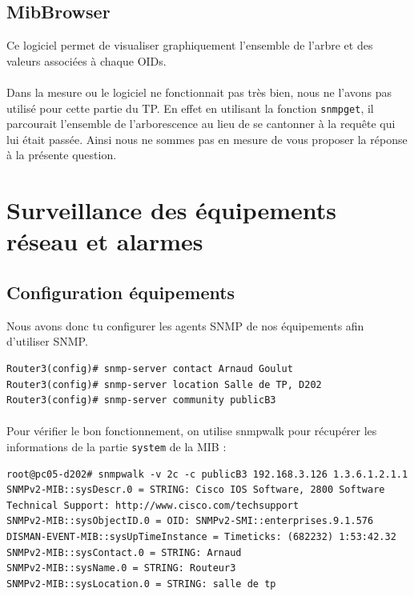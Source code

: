 \documentclass[12pt,a4paper,notitlepage]{article}
\begin{document}
\subsection{MibBrowser}
Ce logiciel permet de visualiser graphiquement l'ensemble de l'arbre et des valeurs associées à chaque OIDs.

\paragraph{}Dans la mesure ou le logiciel ne fonctionnait pas très bien, nous ne l'avons pas utilisé pour cette partie du TP. En effet en utilisant la fonction \texttt{snmpget}, il parcourait l'ensemble de l'arborescence au lieu de se cantonner à la requête qui lui était passée. Ainsi nous ne sommes pas en mesure de vous proposer la réponse à la présente question.

\section{Surveillance des équipements réseau et alarmes}
\subsection{Configuration équipements}
Nous avons donc tu configurer les agents SNMP de nos équipements afin d'utiliser SNMP.\\
\begin{lstlisting}[title=Commandes Cisco pour configurer l'agent SNMP du routeur]
Router3(config)# snmp-server contact Arnaud Goulut
Router3(config)# snmp-server location Salle de TP, D202
Router3(config)# snmp-server community publicB3
\end{lstlisting}

\paragraph{} Pour vérifier le bon fonctionnement, on utilise snmpwalk pour récupérer les informations de la partie \texttt{system} de la MIB :

\begin{lstlisting}[title=Vérification du fonctionnement SNMP sur le routeur]
root@pc05-d202# snmpwalk -v 2c -c publicB3 192.168.3.126 1.3.6.1.2.1.1
SNMPv2-MIB::sysDescr.0 = STRING: Cisco IOS Software, 2800 Software
Technical Support: http://www.cisco.com/techsupport
SNMPv2-MIB::sysObjectID.0 = OID: SNMPv2-SMI::enterprises.9.1.576
DISMAN-EVENT-MIB::sysUpTimeInstance = Timeticks: (682232) 1:53:42.32
SNMPv2-MIB::sysContact.0 = STRING: Arnaud
SNMPv2-MIB::sysName.0 = STRING: Routeur3
SNMPv2-MIB::sysLocation.0 = STRING: salle de tp
\end{lstlisting}
\end{document}
